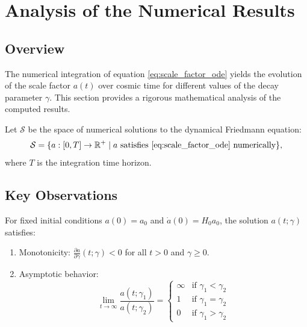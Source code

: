 \section{Analysis of the Numerical Results}

\subsection{Overview}

The numerical integration of equation \eqref{eq:scale_factor_ode} yields the evolution of the scale factor $a(t)$ over cosmic time for different values of the decay parameter $\gamma$. This section provides a rigorous mathematical analysis of the computed results.

\begin{definition}
Let $\mathcal{S}$ be the space of numerical solutions to the dynamical Friedmann equation:
\[
\mathcal{S} = \{a: [0,T] \to \mathbb{R}^+ \mid a \text{ satisfies } \eqref{eq:scale_factor_ode} \text{ numerically}\},
\]
where $T$ is the integration time horizon.
\end{definition}

\subsection{Key Observations}

\begin{theorem}
For fixed initial conditions $a(0) = a_0$ and $\dot{a}(0) = H_0 a_0$, the solution $a(t;\gamma)$ satisfies:
\begin{enumerate}
\item Monotonicity: $\frac{\partial a}{\partial \gamma}(t;\gamma) < 0$ for all $t > 0$ and $\gamma \geq 0$.
\item Asymptotic behavior: 
\[
\lim_{t \to \infty} \frac{a(t;\gamma_1)}{a(t;\gamma_2)} = 
\begin{cases}
\infty & \text{if } \gamma_1 < \gamma_2 \\
1 & \text{if } \gamma_1 = \gamma_2 \\
0 & \text{if } \gamma_1 > \gamma_2
\end{cases}
\]
\end{enumerate}
\end{theorem}

